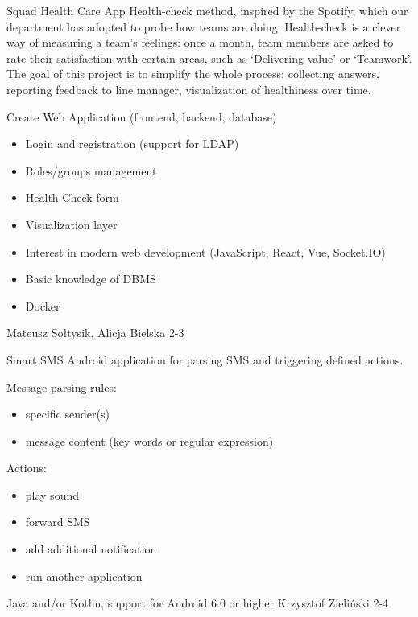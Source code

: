 \begin{project}
{Squad Health Care App}
{
Health-check method, inspired by the Spotify, which our department has adopted to probe how teams are doing. Health-check is a clever way of measuring a team’s feelings: once a month, team members are asked to rate their satisfaction with certain areas, such as ‘Delivering value’ or ‘Teamwork’. The goal of this project is to simplify the whole process: collecting answers, reporting feedback to line manager, visualization of healthiness over time.
}
{
Create Web Application (frontend, backend, database)
\begin{itemize}
	\item Login and registration (support for LDAP)
	\item Roles/groups management
	\item Health Check form
	\item Visualization layer
\end{itemize}
}
{
\begin{itemize}
	\item Interest in modern web development (JavaScript, React, Vue, Socket.IO)
	\item Basic knowledge of DBMS
	\item Docker
\end{itemize}
}
{Mateusz Sołtysik, Alicja Bielska}
{2-3}
\end{project}
\begin{project}
{Smart SMS}
{
Android application for parsing SMS and triggering defined actions.
}
{
Message parsing rules:
\begin{itemize}
	\item specific sender(s)
	\item message content (key words or regular expression)
\end{itemize}
Actions:
\begin{itemize}
	\item play sound
	\item forward SMS
	\item add additional notification
	\item run another application
\end{itemize}
}
{
Java and/or Kotlin, support for Android 6.0 or higher
}
{Krzysztof Zieliński}
{2-4}
\end{project}
